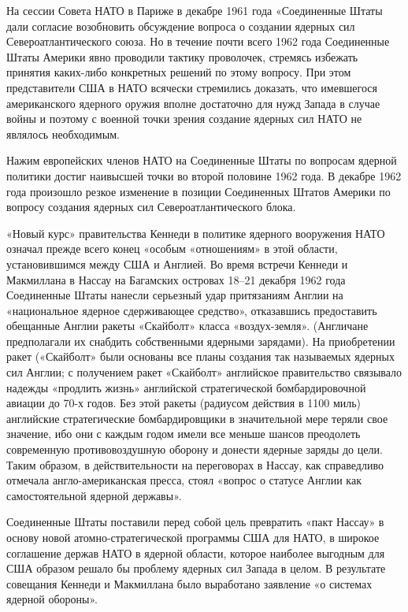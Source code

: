 \documentclass[12pt, a4paper, openany]{book}
\begin{document}
На сессии Совета НАТО в Париже в декабре 1961 года «Соединенные Штаты дали согласие возобновить обсуждение вопроса о создании ядерных сил Североатлантического союза. Но в течение почти всего 1962 года Соединенные Штаты Америки явно проводили тактику проволочек, стремясь избежать принятия каких-либо конкретных решений по этому вопросу. При этом представители США в НАТО всячески стремились доказать, что имевшегося американского ядерного оружия вполне достаточно для нужд Запада в случае войны и поэтому с военной точки зрения создание ядерных сил НАТО не являлось необходимым.
	
Нажим европейских членов НАТО на Соединенные Штаты по вопросам ядерной политики достиг наивысшей точки во второй половине 1962 года. В декабре 1962 года произошло резкое изменение в позиции Соединенных Штатов Америки по вопросу создания ядерных сил Североатлантического блока.
	
«Новый курс» правительства Кеннеди в политике ядерного вооружения НАТО означал прежде всего конец «особым «отношениям» в этой области, установившимся между США и Англией. Во время встречи Кеннеди и Макмиллана в Нассау на Багамских островах 18–21 декабря 1962 года Соединенные Штаты нанесли серьезный удар притязаниям Англии на «национальное ядерное сдерживающее средство», отказавшись предоставить обещанные Англии ракеты «Скайболт» класса «воздух-земля». (Англичане предполагали их снабдить собственными ядерными зарядами). На приобретении ракет («Скайболт» были основаны все планы создания так называемых ядерных сил Англии; с получением ракет «Скайболт» английское правительство связывало надежды «продлить жизнь» английской стратегической бомбардировочной авиации до 70-х годов. Без этой ракеты (радиусом действия в 1100 миль) английские стратегические бомбардировщики в значительной мере теряли свое значение, ибо они с каждым годом имели все меньше шансов преодолеть современную противовоздушную оборону и донести ядерные заряды до цели. Таким образом, в действительности на переговорах в Нассау, как справедливо отмечала англо-американская пресса, стоял «вопрос о статусе Англии как самостоятельной ядерной державы».
	
Соединенные Штаты поставили перед собой цель превратить «пакт Нассау» в основу новой атомно-стратегической программы США для НАТО, в широкое соглашение держав НАТО в ядерной области, которое наиболее выгодным для США образом решало бы проблему ядерных сил Запада в целом. В результате совещания Кеннеди и Макмиллана было выработано заявление «о системах ядерной обороны».
	
\end{document}
